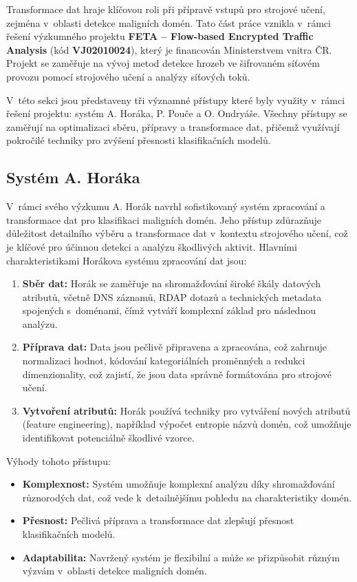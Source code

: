 Transformace dat hraje klíčovou roli při přípravě vstupů pro strojové učení, zejména v~oblasti detekce maligních domén. Tato část práce vznikla v~rámci řešení výzkumného projektu \textbf{FETA -- Flow-based Encrypted Traffic Analysis} (kód \textbf{VJ02010024}), který je financován Ministerstvem vnitra ČR. Projekt se zaměřuje na vývoj metod detekce hrozeb ve šifrovaném síťovém provozu pomocí strojového učení a analýzy síťových toků. 

V~této sekci jsou představeny tři významné přístupy které byly využity v~rámci řešení projektu: systém A. Horáka, P. Pouče a O. Ondryáše. Všechny přístupy se zaměřují na optimalizaci sběru, přípravy a transformace dat, přičemž využívají pokročilé techniky pro zvýšení přesnosti klasifikačních modelů.

\subsection{Systém A. Horáka}

V~rámci svého výzkumu A. Horák \cite{ovi} navrhl sofistikovaný systém zpracování a transformace dat pro klasifikaci maligních domén. Jeho přístup zdůrazňuje důležitost detailního výběru a transformace dat v~kontextu strojového učení, což je klíčové pro účinnou detekci a analýzu škodlivých aktivit. Hlavními charakteristikami Horákova systému zpracování dat jsou:

\begin{enumerate}
\item \textbf{Sběr dat:} Horák se zaměřuje na shromažďování široké škály datových atributů, včetně DNS záznamů, RDAP dotazů a technických metadata spojených s~doménami, čímž vytváří komplexní základ pro následnou analýzu.

\item \textbf{Příprava dat:} Data jsou pečlivě připravena a zpracována, což zahrnuje normalizaci hodnot, kódování kategoriálních proměnných a redukci dimenzionality, což zajistí, že jsou data správně formátována pro strojové učení.

\item \textbf{Vytvoření atributů:} Horák používá techniky pro vytváření nových atributů (feature engineering), například výpočet entropie názvů domén, což umožňuje identifikovat potenciálně škodlivé vzorce.

\end{enumerate}

\noindent Výhody tohoto přístupu:

\begin{itemize}
\item \textbf{Komplexnost:} Systém umožňuje komplexní analýzu díky shromažďování různorodých dat, což vede k~detailnějšímu pohledu na charakteristiky domén.
\item \textbf{Přesnost:} Pečlivá příprava a transformace dat zlepšují přesnost klasifikačních modelů.

\item \textbf{Adaptabilita:} Navržený systém je flexibilní a může se přizpůsobit různým výzvám v~oblasti detekce maligních domén.
\end{itemize}

